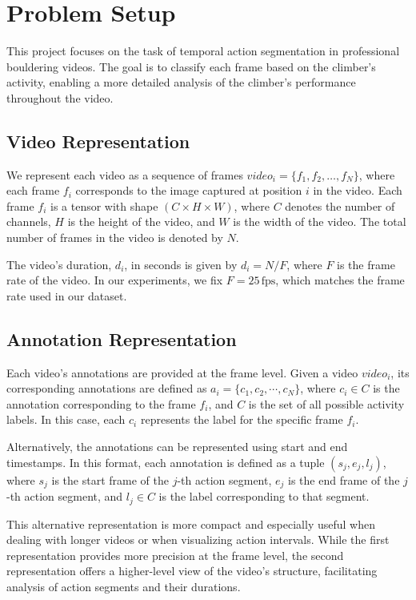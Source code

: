 \section{Problem Setup}

\begin{tcolorbox}[colback=lightgray!10, colframe=black, title={Research Aim}]
    This project focuses on the task of temporal action segmentation in professional bouldering videos. The goal is to classify each frame based on the climber's activity, enabling a more detailed analysis of the climber's performance throughout the video.
\end{tcolorbox}

\subsection{Video Representation}
We represent each video as a sequence of frames $video_i = \{f_1, f_2, \dots, f_N\}$, where each frame $f_i$ corresponds to the image captured at position $i$ in the video. Each frame $f_i$ is a tensor with shape $(C \times H \times W)$, where $C$ denotes the number of channels, $H$ is the height of the video, and $W$ is the width of the video. The total number of frames in the video is denoted by $N$.

The video's duration, $d_i$, in seconds is given by $d_i = N / F$, where $F$ is the frame rate of the video. In our experiments, we fix $F = 25 \, \text{fps}$, which matches the frame rate used in our dataset.

\subsection{Annotation Representation}
Each video's annotations are provided at the frame level. Given a video $video_i$, its corresponding annotations are defined as $a_i = \{c_1, c_2, \cdots, c_N\}$, where $c_i \in C$ is the annotation corresponding to the frame $f_i$, and $C$ is the set of all possible activity labels. In this case, each $c_i$ represents the label for the specific frame $f_i$.

Alternatively, the annotations can be represented using start and end timestamps. In this format, each annotation is defined as a tuple $(s_j, e_j, l_j)$, where $s_j$ is the start frame of the $j$-th action segment, $e_j$ is the end frame of the $j$-th action segment, and $l_j \in C$ is the label corresponding to that segment. 

This alternative representation is more compact and especially useful when dealing with longer videos or when visualizing action intervals. While the first representation provides more precision at the frame level, the second representation offers a higher-level view of the video’s structure, facilitating analysis of action segments and their durations.

